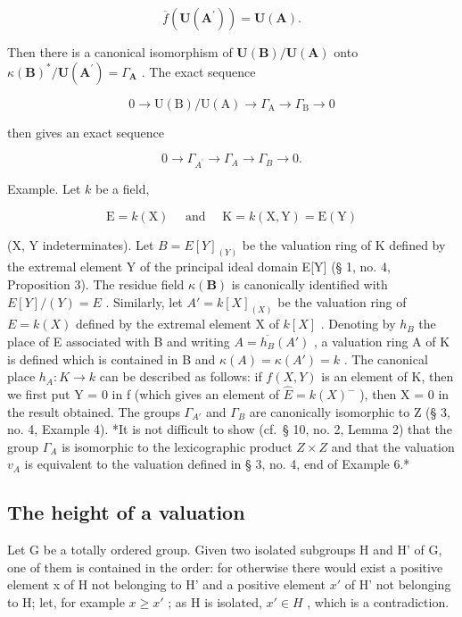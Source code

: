 \[
\overline {{f}} (\mathbf {U} (\mathbf {A} ^ {\prime})) = \mathbf {U} (\mathbf {A}).
\]

Then there is a canonical isomorphism of \(\mathbf{U}(\mathbf{B}) / \mathbf{U}(\mathbf{A})\) onto \(\kappa (\mathbf{B})^{*} / \mathbf{U}(\mathbf{A}^{\prime}) = \Gamma_{\mathbf{A}}\) . The exact sequence

\[
0 \rightarrow \mathrm{U(B)} / \mathrm{U(A)} \rightarrow \Gamma_ {\mathrm{A}} \rightarrow \Gamma_ {\mathrm{B}} \rightarrow 0
\]

then gives an exact sequence

\[
0 \rightarrow \Gamma_ {A ^ {\prime}} \rightarrow \Gamma_ {A} \rightarrow \Gamma_ {B} \rightarrow 0.
\]

Example. Let \(k\) be a field,

\[
\mathrm{E} = k (\mathrm{X}) \quad \text { and } \quad \mathrm{K} = k (\mathrm{X}, \mathrm{Y}) = \mathrm{E} (\mathrm{Y})
\]

(X, Y indeterminates). Let \(B = E[Y]_{(Y)}\) be the valuation ring of K defined by the extremal element Y of the principal ideal domain E{[}Y{]} (§ 1, no. 4, Proposition 3). The residue field \(\kappa(\mathbf{B})\) is canonically identified with \(E[Y]/(Y) = E\) . Similarly, let \(A' = k[X]_{(X)}\) be the valuation ring of \(E = k(X)\) defined by the extremal element X of \(k[X]\) . Denoting by \(h_{B}\) the place of E associated with B and writing \(A = \overline{h_{B}}(A')\) , a valuation ring A of K is defined which is contained in B and \(\kappa(A) = \kappa(A') = k\) . The canonical place \(h_{A}: K \to k\) can be described as follows: if \(f(X, Y)\) is an element of K, then we first put Y = 0 in f (which gives an element of \(\hat{E} = k(X)^{-}\) ), then X = 0 in the result obtained. The groups \(\Gamma_{A'}\) and \(\Gamma_{B}\) are canonically isomorphic to Z (§ 3, no. 4, Example 4). *It is not difficult to show (cf.~§ 10, no. 2, Lemma 2) that the group \(\Gamma_{A}\) is isomorphic to the lexicographic product \(Z \times Z\) and that the valuation \(v_{A}\) is equivalent to the valuation defined in § 3, no. 4, end of Example 6.*

\subsection{The height of a valuation}

Let G be a totally ordered group. Given two isolated subgroups H and H' of G, one of them is contained in the order: for otherwise there would exist a positive element x of H not belonging to H' and a positive element \(x'\) of H' not belonging to H; let, for example \(x \geqslant x'\) ; as H is isolated, \(x' \in H\) , which is a contradiction.

